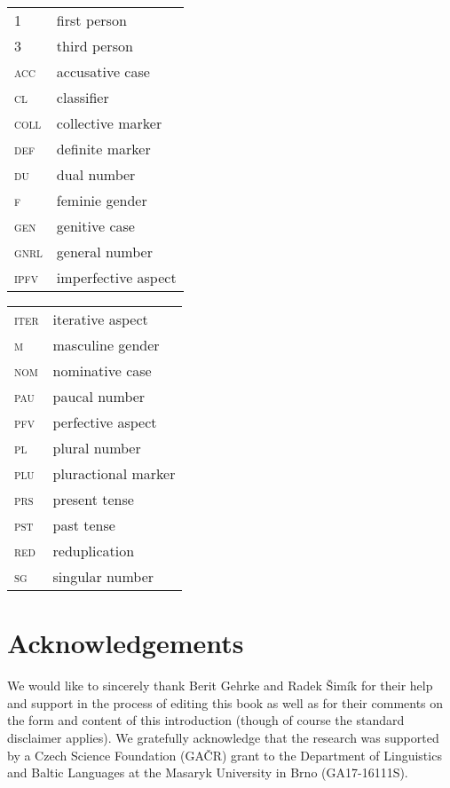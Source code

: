 \documentclass[output=paper]{langscibook}
\begin{document}
\begin{tabularx}{.5\textwidth}{@{}lX@{}}
\textsc{1}&{first person}\\
\textsc{3}&{third person}\\
\textsc{acc}&{accusative case}\\
\textsc{cl}&{classifier}\\
\textsc{coll}&{collective marker}\\
\textsc{def}&{definite marker}\\
\textsc{du}&{dual number}\\
\textsc{f}&{feminie gender}\\
\textsc{gen}&{genitive case}\\
\textsc{gnrl}&{general number}\\
\textsc{ipfv}&{imperfective aspect}\\
\end{tabularx}%
\begin{tabularx}{.5\textwidth}{@{}lX@{}}
\textsc{iter}&{iterative aspect}\\
\textsc{m}&{masculine gender}\\
\textsc{nom}&{nominative case}\\
\textsc{pau}&{paucal number}\\
\textsc{pfv}&{perfective aspect}\\
\textsc{pl}&{plural number}\\
\textsc{plu}&{pluractional marker}\\
\textsc{prs}&{present tense}\\
\textsc{pst}&{past tense}\\
\textsc{red}&{reduplication}\\
\textsc{sg}&{singular number}\\
\end{tabularx}

\section*{Acknowledgements}
We would like to sincerely thank Berit Gehrke and Radek Šimík for their help and support in the process of editing this book as well as for their comments on the form and content of this introduction (though of course the standard disclaimer applies). We gratefully acknowledge that the research was supported by a Czech Science Foundation (GAČR) grant to the Department of Linguistics and Baltic Languages at the Masaryk University in Brno (GA17-16111S).

{\sloppy\printbibliography[heading=subbibliography,notkeyword=this]}
\end{document}
